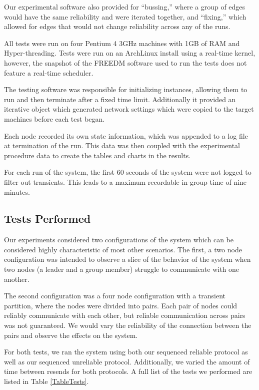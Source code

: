 \documentclass{llncs}
\begin{document}
Our experimental software also provided for ``bussing,'' where a group of edges would
have the same reliability and were iterated together, and ``fixing,'' which allowed for edges that would not change reliability across any of the runs.

All tests were run on four Pentium 4 3GHz machines with 1GB of RAM and Hyper-threading. Tests were run on an ArchLinux install using a real-time kernel, however, the snapshot of the FREEDM software used to run the tests does not feature a real-time scheduler.

The testing software was responsible for initializing instances, allowing them to run and then terminate after a fixed time limit. Additionally it provided an iterative object which generated network settings which were copied to the target machines before each test began.

Each node recorded its own state information, which was appended to a log file at termination of the run. This data was then coupled with the experimental procedure data to create the tables and charts in the results.

For each run of the system, the first 60 seconds of the system were not logged to filter out transients. This leads to a maximum recordable in-group time of nine minutes.
\subsection{Tests Performed}

Our experiments considered two configurations of the system which can be considered highly characteristic of most other scenarios. The first, a two node configuration was intended to observe a slice of the behavior of the system when two nodes (a leader and a group member) struggle to communicate with one another.

The second configuration was a four node configuration with a transient partition, where the nodes were divided into pairs. Each pair of nodes could reliably communicate with each other, but reliable communication across pairs was not guaranteed. We would vary the reliability of the connection between the pairs and observe the effects on the system.

For both tests, we ran the system using both our sequenced reliable protocol as well as our sequenced unreliable protocol. Additionally, we varied the amount of time between resends for both protocols. A full list of the tests we performed are listed in Table \ref{TableTests}.
\end{document}
